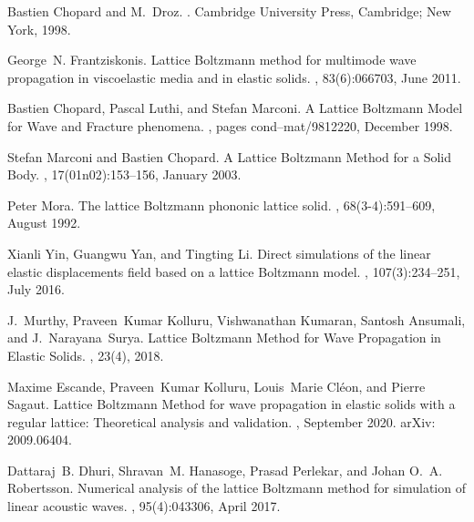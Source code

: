 \documentclass{article}
\begin{document}
\begin{thebibliography}{10}
Bastien Chopard and M.~Droz.
.
\newblock Cambridge University Press, Cambridge; New York, 1998.

George~N. Frantziskonis.
\newblock Lattice {Boltzmann} method for multimode wave propagation in
  viscoelastic media and in elastic solids.
, 83(6):066703, June 2011.

Bastien Chopard, Pascal Luthi, and Stefan Marconi.
\newblock A {Lattice} {Boltzmann} {Model} for {Wave} and {Fracture} phenomena.
, pages cond--mat/9812220, December 1998.

Stefan Marconi and Bastien Chopard.
\newblock A {Lattice} {Boltzmann} {Method} for a {Solid} {Body}.
, 17(01n02):153--156,
  January 2003.

Peter Mora.
\newblock The lattice {Boltzmann} phononic lattice solid.
, 68(3-4):591--609, August 1992.

Xianli Yin, Guangwu Yan, and Tingting Li.
\newblock Direct simulations of the linear elastic displacements field based on
  a lattice {Boltzmann} model.
,
  107(3):234--251, July 2016.

J.~Murthy, Praveen~Kumar Kolluru, Vishwanathan Kumaran, Santosh Ansumali, and
  J.~Narayana~Surya.
\newblock Lattice {Boltzmann} {Method} for {Wave} {Propagation} in {Elastic}
  {Solids}.
, 23(4), 2018.

Maxime Escande, Praveen~Kumar Kolluru, Louis~Marie Cléon, and Pierre Sagaut.
\newblock Lattice {Boltzmann} {Method} for wave propagation in elastic solids
  with a regular lattice: {Theoretical} analysis and validation.
, September 2020.
\newblock arXiv: 2009.06404.

Dattaraj~B. Dhuri, Shravan~M. Hanasoge, Prasad Perlekar, and Johan O.~A.
  Robertsson.
\newblock Numerical analysis of the lattice {Boltzmann} method for simulation
  of linear acoustic waves.
, 95(4):043306, April 2017.


\end{thebibliography}
\end{document}
